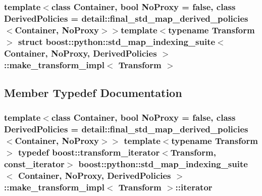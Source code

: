 \subsubsection*{template$<$class \-Container, bool \-No\-Proxy = false, class \-Derived\-Policies = detail\-::final\-\_\-std\-\_\-map\-\_\-derived\-\_\-policies$<$\-Container, No\-Proxy$>$$>$template$<$typename Transform$>$ struct boost\-::python\-::std\-\_\-map\-\_\-indexing\-\_\-suite$<$ Container, No\-Proxy, Derived\-Policies $>$\-::make\-\_\-transform\-\_\-impl$<$ Transform $>$}



\subsection{\-Member \-Typedef \-Documentation}
\hypertarget{structboost_1_1python_1_1std__map__indexing__suite_1_1make__transform__impl_a64d7b60f0e792533c1cc89b84f341b0d}{
\subsubsection[{iterator}]{\setlength{\rightskip}{0pt plus 5cm}template$<$class \-Container, bool \-No\-Proxy = false, class \-Derived\-Policies = detail\-::final\-\_\-std\-\_\-map\-\_\-derived\-\_\-policies$<$\-Container, No\-Proxy$>$$>$ template$<$typename Transform $>$ typedef boost\-::transform\-\_\-iterator$<$\-Transform, {\bf const\-\_\-iterator}$>$ {\bf boost\-::python\-::std\-\_\-map\-\_\-indexing\-\_\-suite}$<$ \-Container, \-No\-Proxy, \-Derived\-Policies $>$\-::{\bf make\-\_\-transform\-\_\-impl}$<$ \-Transform $>$\-::{\bf iterator}}}\label{structboost_1_1python_1_1std__map__indexing__suite_1_1make__transform__impl_a64d7b60f0e792533c1cc89b84f341b0d}


